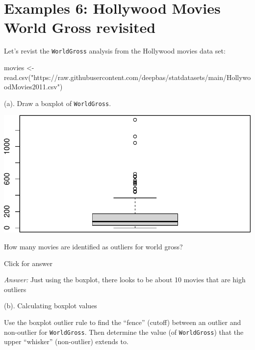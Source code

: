 \documentclass[
]{book}
\newenvironment{Shaded}{\begin{snugshade}}{\end{snugshade}}
\newcommand{\FunctionTok}[1]{\textcolor[rgb]{0.00,0.00,0.00}{#1}}
\newcommand{\NormalTok}[1]{#1}
\newcommand{\OtherTok}[1]{\textcolor[rgb]{0.56,0.35,0.01}{#1}}
\newcommand{\SpecialCharTok}[1]{\textcolor[rgb]{0.00,0.00,0.00}{#1}}
\newcommand{\StringTok}[1]{\textcolor[rgb]{0.31,0.60,0.02}{#1}}
\begin{document}
\hypertarget{examples-6-hollywood-movies-world-gross-revisited}{%
\section{Examples 6: Hollywood Movies World Gross revisited}\label{examples-6-hollywood-movies-world-gross-revisited}}

Let's revist the \texttt{WorldGross} analysis from the Hollywood movies data set:

\begin{Shaded}
\begin{Highlighting}[]
\NormalTok{movies }\OtherTok{\textless{}{-}} \FunctionTok{read.csv}\NormalTok{(}\StringTok{"https://raw.githubusercontent.com/deepbas/statdatasets/main/HollywoodMovies2011.csv"}\NormalTok{)}
\end{Highlighting}
\end{Shaded}

(a). Draw a boxplot of \texttt{WorldGross}.

\begin{Shaded}
\end{Shaded}

\includegraphics[width=1\linewidth]{Class_Activity_5_files/figure-latex/unnamed-chunk-25-1}

How many movies are identified as outliers for world gross?

Click for answer

\emph{Answer:} Just using the boxplot, there looks to be about 10 movies that are high outliers

(b). Calculating boxplot values

Use the boxplot outlier rule to find the ``fence'' (cutoff) between an outlier and non-outlier for \texttt{WorldGross}. Then determine the value (of \texttt{WorldGross}) that the upper ``whisker'' (non-outlier) extends to.
\end{document}
